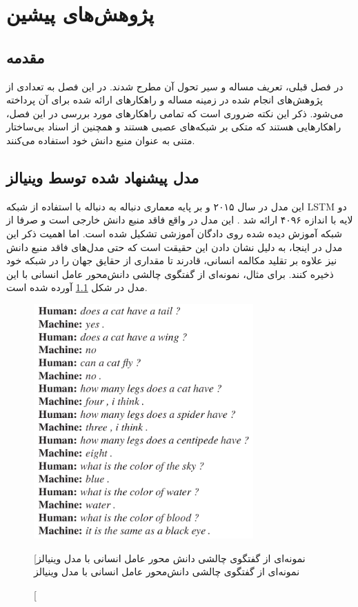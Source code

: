 \chapter{پژوهش‌های پیشین}\label{chap2}
\minitoc

\section{مقدمه}
در فصل قبلی،‌ تعریف مساله و سیر تحول آن مطرح شدند. در این فصل به تعدادی از پژوهش‌های انجام شده در زمینه مساله و راهکار‌های ارائه شده برای آن پرداخته می‌شود. ذکر این نکته ضروری است که تمامی راهکارهای مورد بررسی در این فصل، راهکارهایی هستند که متکی بر شبکه‌های عصبی هستند و همچنین از اسناد بی‌ساختار متنی به عنوان منبع دانش خود استفاده می‌کنند. 
\section{مدل پیشنهاد شده توسط وینیالز}

این مدل در سال ۲۰۱۵ و بر پایه معماری دنباله به دنباله با استفاده از شبکه LSTM 
دو لایه با اندازه 
۴۰۹۶
ارائه شد
\cite{A_Neural_Conversational_Model}.
این مدل در واقع فاقد منبع دانش خارجی است و صرفا از شبکه آموزش دیده شده روی دادگان آموزشی تشکیل شده است. اما اهمیت ذکر این مدل در اینجا، به دلیل نشان دادن این حقیقت است که حتی مدل‌های فاقد منبع دانش نیز  علاوه بر تقلید 
 مکالمه انسانی، قادرند تا مقداری از حقایق جهان را در شبکه خود ذخیره کنند.
 برای مثال،‌ نمونه‌ای از گفتگوی چالشی دانش‌محور عامل انسانی با این مدل در شکل
 \ref{fig:chap2:Vinyals1}
 آورده شده است.

\begin{figure}[h]
	\centering
	\includegraphics[width=0.75\textwidth]{images/chap2/Vinyals1.png}
	\caption
	[نمونه‌ای از گفتگوی چالشی دانش محور عامل انسانی با مدل وینیالز]
	{
		نمونه‌‌ای از گفتگوی چالشی دانش‌محور عامل انسانی با مدل وینیالز
		\cite{A_Neural_Conversational_Model} 
	}
	\label{fig:chap2:Vinyals1}
\end{figure}

